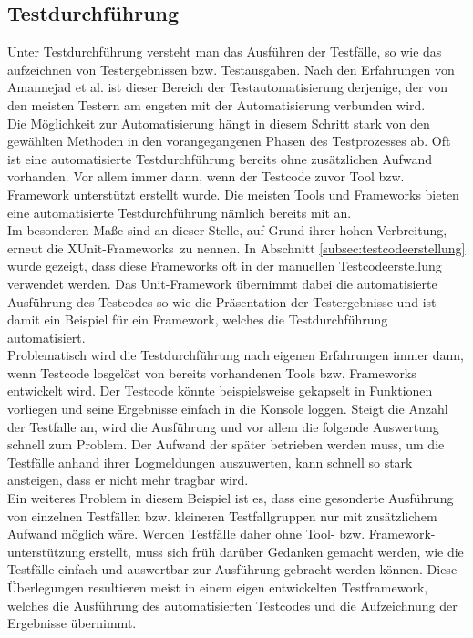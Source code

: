 \subsection{Testdurchführung}
\label{subsec:testdurchführung}
Unter Testdurchführung versteht man das Ausführen der Testfälle, so wie das aufzeichnen von Testergebnissen bzw. Testausgaben. Nach den Erfahrungen von Amannejad et al. \cite{amannejad_search-based_2014} ist dieser Bereich der Testautomatisierung derjenige, der von den meisten Testern am engsten mit der Automatisierung verbunden wird.\\
Die Möglichkeit zur Automatisierung hängt in diesem Schritt stark von den gewählten Methoden in den vorangegangenen Phasen des Testprozesses ab. Oft ist eine automatisierte Testdurchführung bereits ohne zusätzlichen Aufwand vorhanden. Vor allem immer dann, wenn der Testcode zuvor Tool bzw. Framework unterstützt erstellt wurde.
Die meisten Tools und Frameworks bieten eine automatisierte Testdurchführung nämlich bereits mit an.\\
Im besonderen Maße sind an dieser Stelle, auf Grund ihrer hohen Verbreitung, erneut die \grq XUnit-Frameworks\grq\ zu nennen.
In Abschnitt \ref{subsec:testcodeerstellung} wurde gezeigt, dass diese Frameworks oft in der manuellen Testcodeerstellung verwendet werden. Das Unit-Framework übernimmt dabei die automatisierte Ausführung des Testcodes so wie die Präsentation der Testergebnisse und ist damit ein Beispiel für ein Framework, welches die Testdurchführung automatisiert.\\
Problematisch wird die Testdurchführung nach eigenen Erfahrungen immer dann, wenn Testcode losgelöst von bereits vorhandenen Tools bzw. Frameworks entwickelt wird. Der Testcode könnte beispielsweise gekapselt in Funktionen vorliegen und seine Ergebnisse einfach in die Konsole loggen. Steigt die Anzahl der Testfalle an, wird die Ausführung und vor allem die folgende Auswertung schnell zum Problem. Der Aufwand der später betrieben werden muss, um die Testfälle anhand ihrer Logmeldungen auszuwerten, kann schnell so stark ansteigen, dass er nicht mehr tragbar wird.\\ 
Ein weiteres Problem in diesem Beispiel ist es, dass eine gesonderte Ausführung von einzelnen Testfällen bzw. kleineren Testfallgruppen nur mit zusätzlichem Aufwand möglich wäre.
Werden Testfälle daher ohne Tool- bzw. Framework-unterstützung erstellt, muss sich früh darüber Gedanken gemacht werden, wie die Testfälle einfach und auswertbar zur Ausführung gebracht werden können.
Diese Überlegungen resultieren meist in einem eigen entwickelten Testframework, welches die Ausführung des automatisierten Testcodes und die Aufzeichnung der Ergebnisse übernimmt.


